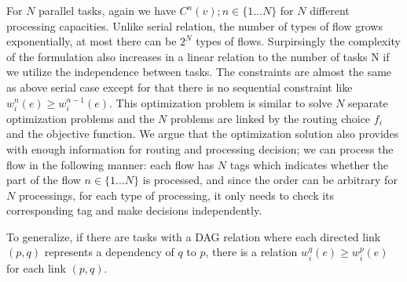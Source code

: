 For $N$ parallel tasks, again we have $C^n(v); n\in\{1\dots N\}$ for $N$ different processing capacities. Unlike serial relation, the number of types of flow grows exponentially, at most there can be $2^N$ types of flows. Surpirsingly the complexity of the formulation also increases in a linear relation to the number of tasks N if we utilize the independence between tasks. The constraints are almost the same as above serial case except for that there is no sequential constraint like $w_i^n(e) \geq w_i^{n-1}(e)$. This optimization problem is similar to solve $N$ separate optimization problems and the $N$ problems are linked by the routing choice $f_i$ and the objective function. We argue that the optimization solution also provides with enough information for routing and processing decision; we can process the flow in the following manner: each flow has $N$ tags which indicates whether the part of the flow $n\in\{1\dots N\}$ is processed, and since the order can be arbitrary for $N$ processings, for each type of processing, it only needs to check its corresponding tag and make decisions independently. 

To generalize, if there are tasks with a DAG relation where each directed link $(p,q)$ represents a dependency of $q$ to $p$, there is a relation $w_i^q(e) \geq w_i^p(e)$ for each link $(p,q)$.  
